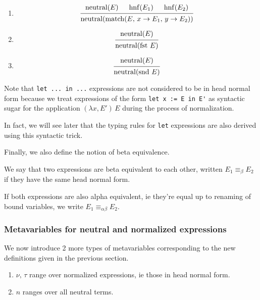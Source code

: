 \documentclass{article}
\begin{document}
\begin{definition} 
\begin{enumerate}
  \item \[
    \begin{prooftree}
      \hypo{\neutral(E)} 
      \hypo{\hnf(E_1)} 
      \hypo{\hnf(E_2)} 
      \infer3{\neutral(\match(E, \, x \rightarrow E_1, \, y \rightarrow E_2))}
    \end{prooftree}
  \]

  \item \[
    \begin{prooftree}
      \hypo{\neutral(E)} 
      \infer1{\neutral(\fst \, E)}
    \end{prooftree}
  \]

  \item \[
    \begin{prooftree}
      \hypo{\neutral(E)} 
      \infer1{\neutral(\snd \, E)}
    \end{prooftree}
  \]
\end{enumerate}
\end{definition}

Note that \verb|let ... in ...| expressions are not considered to be in head normal form
because we treat expressions of the form \verb|let x := E in E'| as syntactic
sugar for the application $(\lambda x, E') \, E$ during the process of
normalization. 

In fact, we will see later that the typing rules for \verb|let|
expressions are also derived using this syntactic trick. 

Finally, we also define the notion of beta equivalence. 

\begin{definition} 
We say that two expressions are beta equivalent to each other, written
$E_1 \equiv_\beta E_2$ if they have the same head normal form.

If both expressions are also alpha equivalent, ie
they're equal up to renaming of bound variables, we write
$E_1 \equiv_{\alpha \beta} E_2$.
\end{definition}

\subsubsection{Metavariables for neutral and normalized expressions}
We now introduce 2 more types of metavariables corresponding to the new definitions
given in the previous section. 

\begin{enumerate}
\item $\nu, \, \tau$ range over normalized expressions, ie those in head normal
form.
\item $n$ ranges over all neutral terms.
\end{enumerate}
\end{document}

